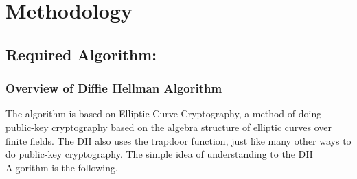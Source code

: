 \chapter{Methodology}

\section{Required Algorithm:}

\subsection{Overview of  Diffie Hellman Algorithm}
The algorithm is based on Elliptic Curve Cryptography, a method of doing public-key cryptography based on the algebra structure of elliptic curves over finite fields. The DH also uses the trapdoor function, just like many other ways to do public-key cryptography. The simple idea of understanding to the DH Algorithm is the following.

